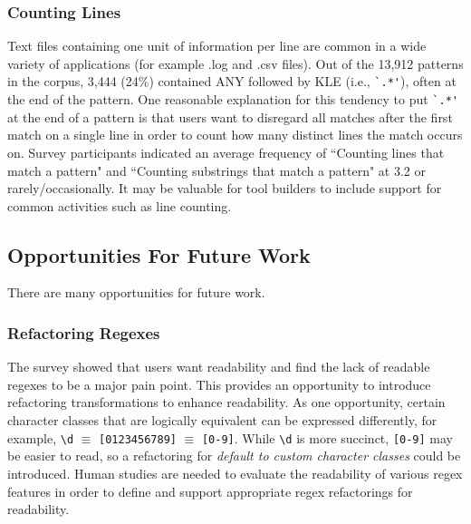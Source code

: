 \subsubsection{Counting Lines}
Text files containing one unit of information per line are common in a wide variety of applications (for example .log and .csv files).  Out of the 13,912 patterns in the corpus, 3,444 (24\%) contained ANY followed by KLE  (i.e., \verb!`.*'!), often at the end of the pattern.
One reasonable explanation for this tendency to put \verb!`.*'! at the end of a pattern is that users want to disregard all matches after the first match on a single line in order to count how many distinct lines the match occurs on.  Survey participants indicated an average frequency of ``Counting lines that match a pattern" and ``Counting substrings that match a pattern" at 3.2 or rarely/occasionally. It may be valuable for tool builders to include support for common activities such as line counting. 






\subsection{Opportunities For Future Work}

There are many opportunities for future work. 




\subsubsection{Refactoring Regexes}
The survey showed that users want readability and find the lack of readable regexes to be a major pain point.
This provides an opportunity to introduce refactoring transformations to enhance readability.
As one opportunity, certain character classes that are logically equivalent can be expressed differently, for example, \verb!\d! $\equiv$ \verb![0123456789]! $\equiv$ \verb![0-9]!. While \verb!\d! is more succinct, \verb![0-9]! may be easier to read, so a refactoring for \emph{default to custom character classes} could be introduced.
Human studies are needed to evaluate the readability of various regex features in order to define and support appropriate regex refactorings for readability.

